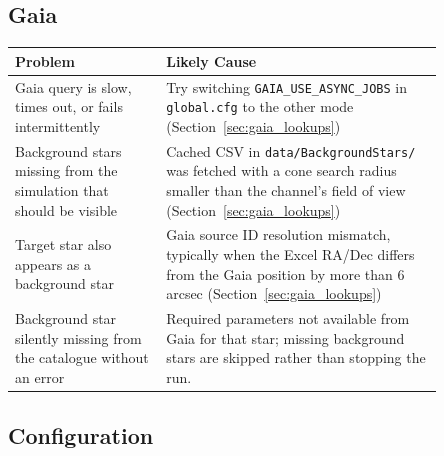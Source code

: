 \subsection{Gaia}

\begin{center}
    \begin{tabular}{p{0.30\linewidth} p{0.55\linewidth}}
        \toprule
        \textbf{Problem}                                                     & \textbf{Likely Cause}                                                                                                                                        \\
        \midrule
        Gaia query is slow, times out, or fails intermittently               & Try switching \texttt{GAIA\_USE\_ASYNC\_JOBS} in \texttt{global.cfg} to the other mode (Section~\ref{sec:gaia_lookups})                                      \\
        \midrule
        Background stars missing from the simulation that should be visible  & Cached CSV in \texttt{data/BackgroundStars/} was fetched with a cone search radius smaller than the channel's field of view (Section~\ref{sec:gaia_lookups}) \\
        \midrule
        Target star also appears as a background star                        & Gaia source ID resolution mismatch, typically when the Excel RA/Dec differs from the Gaia position by more than 6 arcsec (Section~\ref{sec:gaia_lookups})    \\
        \midrule
        Background star silently missing from the catalogue without an error & Required parameters not available from Gaia for that star; missing background stars are skipped rather than stopping the run.                                \\
        \bottomrule
    \end{tabular}
\end{center}

\subsection{Configuration}

